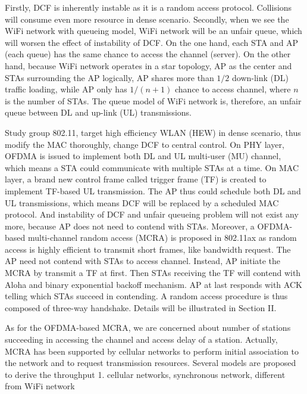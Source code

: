 \documentclass[journal]{IEEEtran}
\begin{document}
Firstly, DCF is inherently instable as it is a random access protocol. 
Collisions will consume even more resource in dense scenario. 
Secondly, when we see the WiFi network with queueing model, WiFi network will be an unfair queue, which will worsen the effect of instability of DCF. 
On the one hand, each STA and AP  (each queue) has the same chance to access the channel (server). 
On the other hand, because WiFi network operates in a star topology, AP as the center and STAs surrounding the AP logically, AP shares more than $1/2$ down-link (DL) traffic loading, while AP only has $1/(n+1)$ chance to access channel, where $n$ is the number of STAs.
The queue model of WiFi network is, therefore, an unfair queue between DL and up-link (UL) transmissions. 


Study group 802.11, target high efficiency WLAN (HEW) in dense scenario, thus modify the MAC thoroughly, change DCF to central control. 
On PHY layer, OFDMA is issued to implement both DL and UL multi-user (MU) channel, which means a STA could communicate with multiple STAs at a time. 
On MAC layer, a brand new control frame called trigger frame (TF) is created to implement TF-based UL transmission. 
The AP thus could schedule both DL and UL transmissions, which means DCF will be replaced by a scheduled MAC protocol. 
And instability of DCF and unfair queueing problem will not exist any more, because AP does not need to contend with STAs.
Moreover, a OFDMA-based multi-channel random access (MCRA) is proposed in 802.11ax as random access is highly efficient to transmit short frames, like bandwidth request. 
The AP need not contend with STAs to access channel.
Instead, AP initiate the MCRA by transmit a TF at first. 
Then STAs receiving the TF will contend with Aloha and binary exponential backoff mechanism. 
AP at last responds with ACK telling which STAs succeed in contending.
A random access procedure is thus composed of three-way handshake. 
Details will be illustrated in Section II.

As for the OFDMA-based MCRA, we are concerned about number of stations succeeding in accessing the channel and access delay of a station.
Actually, MCRA has been supported by cellular networks to perform initial association to the network and to request transmission resources. 
Several models are proposed to derive the throughput 
1. cellular networks, synchronous network, different from WiFi network
\end{document}
